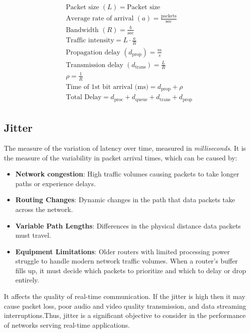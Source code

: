 \documentclass[
	a4paper,
	10pt,
	unnumberedsections,
	twoside, 
]{LTJournalArticle}
\begin{document}
\begin{flushleft}
	\begin{align*}
		&\text{Packet size } (L) = \text{Packet size} \\
		&\text{Average rate of arrival } (a) = \frac{\text{packets}}{\text{sec}} \\
		&\text{Bandwidth } (R) = \frac{b}{\text{sec}} \\
		&\text{Traffic intensity} = L \cdot \frac{a}{R} \\
		&\text{Propagation delay } (d_{\text{prop}}) = \frac{m}{s} \\
		&\text{Transmission delay } (d_{\text{trans}}) = \frac{L}{R} \\
		&\rho = \frac{1}{R} \\
		&\text{Time of 1st bit arrival (ms)} = d_{\text{prop}} + \rho \\
		&\text{Total Delay} = d_{\text{proc}} + d_{\text{queue}} + d_{\text{trans}} + d_{\text{prop}} \\
	\end{align*}
\end{flushleft}


\label{sec:background}
\subsection{Jitter}
The measure of the variation of latency over time, measured in \textit{milliseconds}. It is the measure of the variability in packet arrival times, which can be caused by:
\begin{itemize}
	\item \textbf{Network congestion}: High traffic volumes causing packets to take longer paths or experience delays.
	\item \textbf{Routing Changes}: Dynamic changes in the path that data packets take across the network.
	\item \textbf{Variable Path Lengths}: Differences in the physical distance data packets must travel.
	\item \textbf{Equipment Limitations}: Older routers with limited processing power struggle to handle modern network traffic volumes. When a router's buffer fills up, it must decide which packets to prioritize and which to delay or drop entirely.
\end{itemize}
It affects the quality of real-time communication. If the jitter is high then it may cause packet loss, poor audio and video quality transmission, and data streaming interruptions.Thus, jitter is a significant objective to consider in the performance of networks serving real-time applications.
\end{document}
